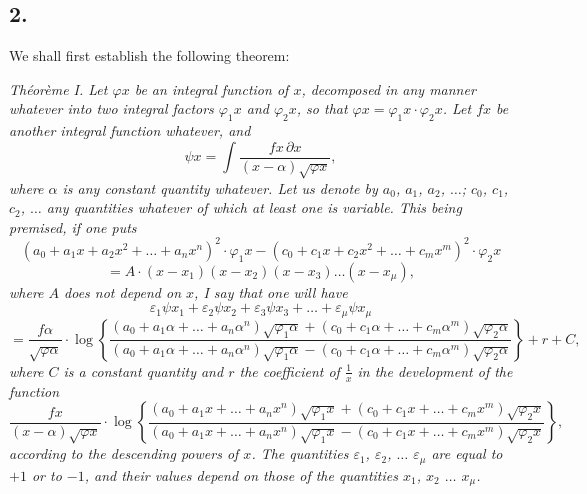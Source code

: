 \documentclass{article}
\begin{document}
\subsection*{2.}

We shall first establish the following theorem:

\emph{Théorème I. Let $\varphi x$ be an integral function of $x$, decomposed in any manner whatever into two integral factors $\varphi_1 x$ and $\varphi_2 x$, so that $\varphi x = \varphi_1 x \cdot \varphi_2 x$. Let $fx$ be another integral function whatever, and}
\[ \psi x = \int \frac{fx \, \partial x}{(x-\alpha)\sqrt{\varphi x}}, \tag{2} \]
\emph{where $\alpha$ is any constant quantity whatever. Let us denote by $a_0$, $a_1$, $a_2$, $\ldots$; $c_0$, $c_1$, $c_2$, $\ldots$ any quantities whatever of which at least one is variable. This being premised, if one puts}
\[ (a_0+a_1x+a_2x^{2}+\ldots+a_nx^{n})^{2} \cdot \varphi_1 x-(c_0+c_1x+c_2x^{2}+\ldots+c_mx^{m})^{2} \cdot \varphi_2 x \tag{3} \]
\[ = A \cdot (x-x_1)(x-x_2)(x-x_3)\ldots(x-x_\mu), \]
\emph{where $A$ does not depend on $x$, I say that one will have}
\[ \varepsilon_1\psi x_1 + \varepsilon_2\psi x_2 + \varepsilon_3\psi x_3 + \ldots + \varepsilon_\mu\psi x_\mu \tag{4} \]
\[ = \frac{f\alpha}{\sqrt{\varphi\alpha}} \cdot \log\left\{\frac{(a_0+a_1\alpha+\ldots+a_n\alpha^{n})\sqrt{\varphi_1\alpha}+(c_0+c_1\alpha+\ldots+c_m\alpha^{m})\sqrt{\varphi_2\alpha}}{(a_0+a_1\alpha+\ldots+a_n\alpha^{n})\sqrt{\varphi_1\alpha}-(c_0+c_1\alpha+\ldots+c_m\alpha^{m})\sqrt{\varphi_2\alpha}}\right\}+r+C, \]
\emph{where $C$ is a constant quantity and $r$ the coefficient of $\frac{1}{x}$ in the development of the function}
\[ \frac{fx}{(x-\alpha)\sqrt{\varphi x}} \cdot \log\left\{\frac{(a_0+a_1x+\ldots+a_nx^{n})\sqrt{\varphi_1 x}+(c_0+c_1x+\ldots+c_mx^{m})\sqrt{\varphi_2 x}}{(a_0+a_1x+\ldots+a_nx^{n})\sqrt{\varphi_1 x}-(c_0+c_1x+\ldots+c_mx^{m})\sqrt{\varphi_2 x}}\right\}, \]
\emph{according to the descending powers of $x$. The quantities $\varepsilon_1$, $\varepsilon_2$, $\ldots$ $\varepsilon_\mu$ are equal to $+1$ or to $-1$, and their values depend on those of the quantities $x_1$, $x_2$ $\ldots$ $x_\mu$.}
\end{document}
